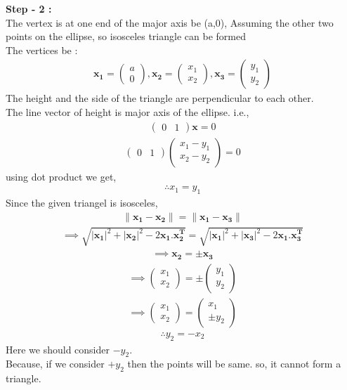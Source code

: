 \documentclass[10pt,a4paper]{report}
\newcommand{\myvec}[1]{\ensuremath{\begin{pmatrix}#1\end{pmatrix}}}
\let\vec\mathbf
\begin{document}
\begin{multicols}{2}
\raggedright \textbf{Step - 2 :}\\ \vspace{2mm}
The vertex is at one end of the major axis be (a,0),
Assuming the other two points on the ellipse, so isosceles triangle can be formed\\ \vspace{1mm}
The vertices be :
\begin{align}
\vec{x_1}=\myvec{a\\0} , \vec{x_2}=\myvec{x_1\\x_2}, \vec{x_3}=\myvec{y_1\\y_2}
\end{align}
The height and the side of the triangle are perpendicular to each other.\\
The line vector of height is major axis of the ellipse. 
i.e.,
\begin{align*}
\myvec{0&1} \vec{x}=0
\end{align*}
\begin{align}
\myvec{0&1}\myvec{x_1-y_1\\x_2-y_2}=0
\end{align}
using dot product we get,
\begin{align}
\therefore x_1=y_1
\end{align}
Since the given triangel is isosceles,
\begin{align}
\|\vec{x_1}-\vec{x_2}\|=\|\vec{x_1}-\vec{x_3}\|
\end{align}
\begin{align*}
\implies \sqrt{|\vec{x_1}|^2+|\vec{x_2}|^2-2\vec{x_1.x_2^T}}=\sqrt{|\vec{x_1}|^2+|\vec{x_3}|^2-2\vec{x_1.x_3^T}}
\end{align*}
\begin{align}
\implies \vec{x_2}=\pm \vec{x_3}
\end{align}
\begin{align*}
\implies \myvec{x_1\\x_2}=\pm \myvec{y_1\\y_2}
\end{align*}
\begin{align*}
\implies \myvec{x_1\\x_2}=\myvec{x_1\\ \pm y_2}
\end{align*}
\begin{align}
\therefore y_2 = - x_2
\end{align}
\centering Here we should consider $-y_2$. \\Because, if we consider $+y_2$ then the points will be same. so, it cannot form a triangle.\\ \vspace{3mm}


\end{multicols}
\end{document}
